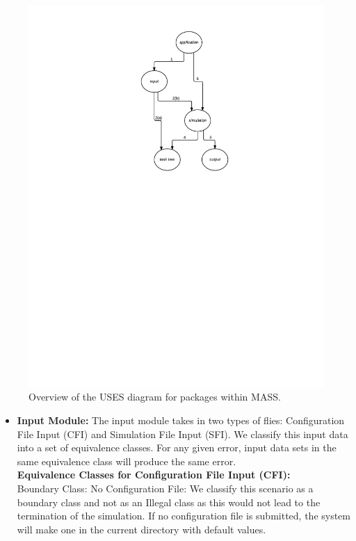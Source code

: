 \begin{enumerate}
\begin{itemize}
\begin{figure}[H]
\centering
\includegraphics[trim=3.5cm 15.5cm 0cm 0cm, width=8.0in]{figs/OverviewUsesDiagram}
\caption{Overview of the USES diagram for packages within MASS.}
\label{fig:OverviewUsesDiagram }
\end{figure}

\begin{itemize}

\item \textbf{Input Module:} The input module takes in two types of flies: Configuration File Input (CFI) and Simulation File Input (SFI). We classify this input data into a set of equivalence classes. For any given error, input data sets in the same equivalence class will produce the same error. \\

\textbf{Equivalence Classes for Configuration File Input (CFI):} \\
Boundary Class: No Configuration File: We classify this scenario as a boundary class and not as an Illegal class as this would not lead to the termination of the simulation. If no configuration file is submitted, the system will make one in the current directory with default values. \\


\end{itemize}
\end{itemize}
\end{enumerate}
